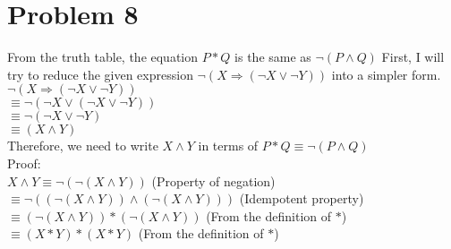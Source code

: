 \documentclass[english]{article}
\begin{document}
\section*{Problem 8}
From the truth table, the equation $P * Q $ is the same as $ \lnot (P \land Q)$ 
 First, I will try to reduce the given expression $ \lnot ( X \Rightarrow (\lnot X \lor \lnot Y)) $ into a simpler form. \\
 $ \lnot ( X \Rightarrow (\lnot X \lor \lnot Y)) $ \\
 $ \equiv \lnot (\lnot X \lor (\lnot X \lor \lnot Y))$  \\
 $ \equiv \lnot (\lnot X \lor \lnot Y) $  \\
 $ \equiv (X \land Y)$  \\
 Therefore, we need to write $ X \land Y$ in terms of $ P * Q \equiv \lnot (P \land Q)$ \\
 Proof: \\
 $ X \land Y \equiv \lnot (\lnot (X \land Y)) $ \qquad (Property of negation) \\
 $ \equiv \lnot ((\lnot(X \land Y)) \land (\lnot(X \land Y)))$ \qquad (Idempotent property) \\
 $ \equiv (\lnot(X \land Y)) * (\lnot(X \land Y)) $ \qquad (From the definition of $*$)\\
 $ \equiv (X * Y ) * (X * Y)$ (From the definition of $*$) \\
\end{document}
